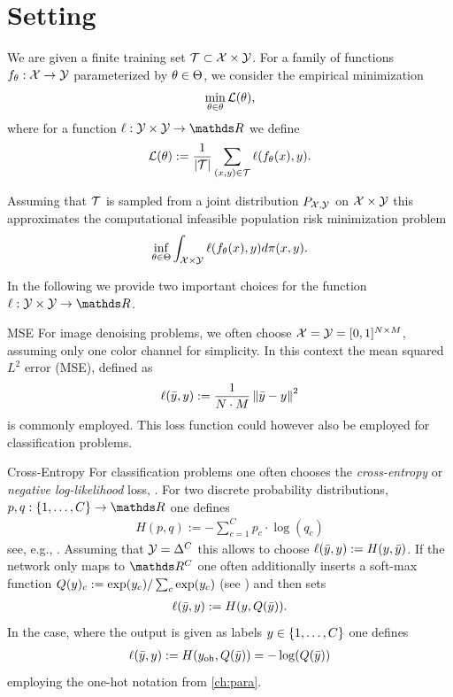\section{Setting}\label{sec:SLSet}
%
We are given a finite training set $\mathcal{T}\subset\mathcal{X}\times\mathcal{Y}$. For a family of functions $f_\theta:\mathcal{X}\to\mathcal{Y}$ parameterized by $\theta\in \Theta$, we consider the empirical  minimization
%
\begin{align*}
\min_{\theta\in\theta} \mathcal{L}(\theta),
\end{align*} 
%
where for a function $\ell:\OutSpace\times\OutSpace\to\R$ we define
\begin{align}\label{eq:empLoss}
\mathcal{L}(\theta)  := \frac{1}{\left|\mathcal{T}\right|}\sum_{(x,y)\in \mathcal{T}} \ell(f_\theta(x), y).
\end{align}
%
%
\begin{remark}{}{}
%
Assuming that $\mathcal{T}$ is sampled from a joint distribution $P_{\mathcal{X},\mathcal{\mathcal{Y}}}$ on $\mathcal{X}\times\mathcal{\mathcal{Y}}$ this approximates the computational infeasible population risk minimization problem
%
\begin{align*}
\inf_{\theta\in\Theta}\int_{\mathcal{X}\times\mathcal{Y}} \ell(f_\theta(x), y) d\pi(x,y).
\end{align*}
\end{remark}
%
%
\noindent%
In the following we provide two important choices for the function $\ell:\Oup\times\Oup\to\R$.
%
%
\begin{example}{MSE}{}
For image denoising problems, we often choose $\mathcal{X}=\mathcal{\mathcal{Y}}=[0,1]^{N\times M}$, assuming only one color channel for simplicity. In this context the mean squared $L^2$ error (MSE), defined as
%
\begin{align*}
\ell(\bar{y},y) := \frac{1}{N\cdot M} \left\|\bar{y}-y\right\|^2
\end{align*}
%
is commonly employed. This loss function could however also be employed for classification problems.
\end{example}
%
%
\begin{example}{Cross-Entropy}{}
For classification problems one often chooses the \emph{cross-entropy} or \emph{negative log-likelihood} loss, \cite{good1952rational}. For two discrete probability distributions, $p,q:\{1,\ldots,C\}\to\R$ one defines
%
\begin{align*}
H(p,q) := -\sum_{c=1}^C p_c\cdot \log(q_c)
\end{align*}
%
see, e.g., \cite{cybenko1998mathematics}. Assuming that $\mathcal{\mathcal{Y}}=\Delta^C$ this allows to choose $\ell(\bar{y},y):=H(y, \bar{y})$. If the network only maps to $\R^C$ one often additionally inserts a soft-max function $Q(y)_c:= \exp(y_c)/\sum_c \exp(y_c)$ (see \cite{boltzmann1868studien}) and then sets
%
\begin{align*}
\ell(\bar{y}, y) := H(y, Q(\bar{y})).
\end{align*}
%
In the case, where the output is given as labels $y\in\{1,\ldots,C\}$ one defines
%
\begin{align*}
\ell(\bar{y}, y) := H(y_{{\operatorname{oh}}}, Q(\bar{y})) = -\log(Q(\bar{y}))
\end{align*}
%
employing the one-hot notation from \cref{ch:para}.
%
\end{example}
%
%
